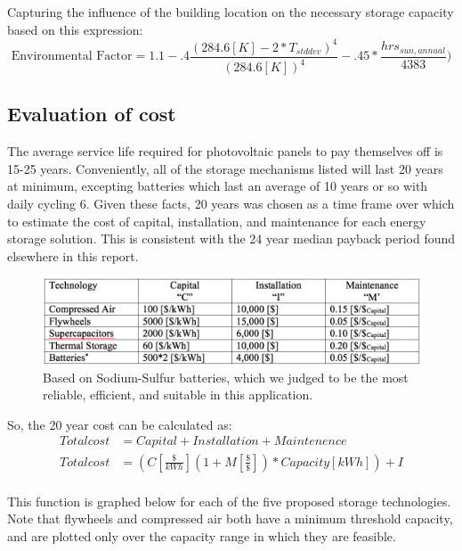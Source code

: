 Capturing the influence of the building location on the necessary storage capacity
based on this expression:
\begin{equation}
\text{Environmental Factor}=1.1-.4\frac{(284.6[K]-2*T_{stddev})^4}{(284.6
[K])^4}-.45*\frac{hrs_{sun,annual}}{4383})
\end{equation}


\subsection{Evaluation of cost}

The average service life required for photovoltaic panels to pay themselves off
is 15-25 years. Conveniently, all of the storage mechanisms listed will last 20
years at minimum, excepting batteries which last an average of 10 years or so 
with daily cycling \cite{patrick}{6}. Given these facts, 20 years was chosen as a time frame over which
to estimate the cost of capital, installation, and maintenance for each energy
storage solution. This is consistent with the 24 year median payback period found
elsewhere in this report.

\begin{figure}
\begin{center}
\includegraphics[scale=0.3]{pics/PatrickTable0.png}
\caption{Based on Sodium-Sulfur batteries, which we judged to be the most
reliable, efficient, and suitable in this application.}
\label{patrickTable0}
\end{center}
\end{figure}

So, the 20 year cost can be calculated as:
\begin{equation}
\begin{aligned}
Total cost&=Capital+Installation+Maintenence\\
Total cost&=(C[\frac{\$}{kWh}](1+M[\frac{\$}{\$}])*Capacity[kWh])+I\\
\end{aligned}
\end{equation}

This function is graphed below for each of the five proposed storage
technologies. Note that flywheels and compressed air both have a minimum
threshold capacity, and are plotted only over the capacity range in which they
are feasible.

